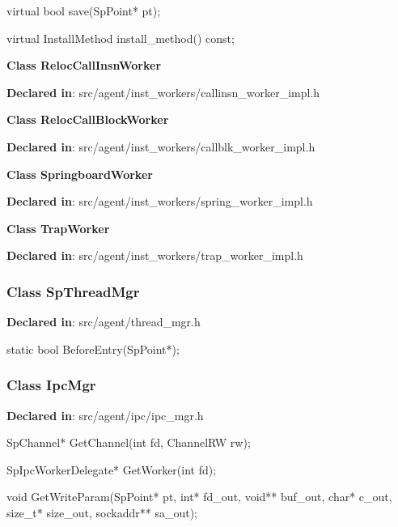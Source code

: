 \begin{apient}
virtual bool save(SpPoint* pt);
\end{apient}

\begin{apient}
virtual InstallMethod install_method() const;
\end{apient}

\textbf{Class RelocCallInsnWorker}

\textbf{Declared in}: src/agent/inst\_workers/callinsn\_worker\_impl.h

\textbf{Class RelocCallBlockWorker}

\textbf{Declared in}: src/agent/inst\_workers/callblk\_worker\_impl.h

\textbf{Class SpringboardWorker}

\textbf{Declared in}: src/agent/inst\_workers/spring\_worker\_impl.h

\textbf{Class TrapWorker}

\textbf{Declared in}: src/agent/inst\_workers/trap\_worker\_impl.h


\subsubsection{Class SpThreadMgr}
\textbf{Declared in}: src/agent/thread\_mgr.h

\begin{apient}
static bool BeforeEntry(SpPoint*);
\end{apient}
\apidesc{
}

\subsubsection{Class IpcMgr}
\textbf{Declared in}: src/agent/ipc/ipc\_mgr.h

\begin{apient}
SpChannel* GetChannel(int fd,
                      ChannelRW rw);
\end{apient}
\apidesc{
}

\begin{apient}
SpIpcWorkerDelegate* GetWorker(int fd);
\end{apient}
\apidesc{
}

\begin{apient}
void GetWriteParam(SpPoint* pt,
                   int* fd_out,
                   void** buf_out,
                   char* c_out,
                   size_t* size_out,
                   sockaddr** sa_out);
\end{apient}
\apidesc{
}

